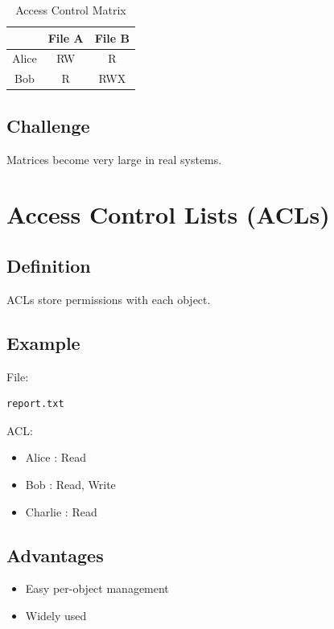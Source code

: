 \begin{table}[h]
\centering
\begin{tabular}{|c|c|c|}
\hline
 & File A & File B \\
\hline
Alice & RW & R \\
\hline
Bob & R & RWX \\
\hline
\end{tabular}
\caption{Access Control Matrix}
\end{table}

\subsection{Challenge}

Matrices become very large in real systems.

\section{Access Control Lists (ACLs)}

\subsection{Definition}

ACLs store permissions with each object.

\subsection{Example}

File:

\begin{verbatim}
report.txt
\end{verbatim}

ACL:

\begin{itemize}
\item Alice : Read
\item Bob : Read, Write
\item Charlie : Read
\end{itemize}

\subsection{Advantages}

\begin{itemize}
\item Easy per-object management
\item Widely used
\end{itemize}

